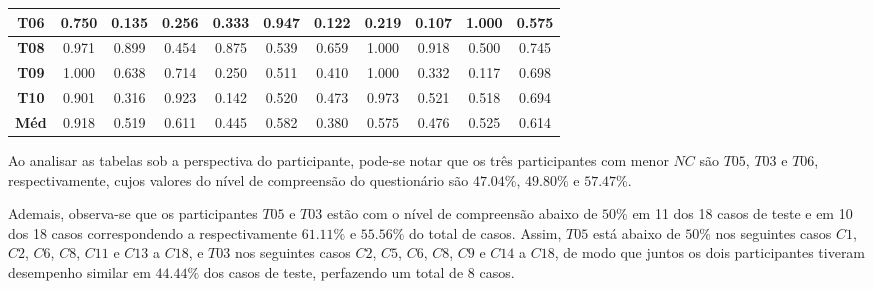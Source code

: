 \begin{table}[htbp]
\begin{tabular}{|c|ccccccccc|c|}
		\textbf{T06} & \multicolumn{1}{c|}{0.750} & \multicolumn{1}{c|}{0.135} & \multicolumn{1}{c|}{0.256} & \multicolumn{1}{c|}{0.333} & \multicolumn{1}{c|}{0.947} & \multicolumn{1}{c|}{0.122} & \multicolumn{1}{c|}{0.219} & \multicolumn{1}{c|}{0.107} & 1.000 & 0.575 \\ \hline
		\rowcolor[HTML]{F2F2F2} 
		\textbf{T08} & \multicolumn{1}{c|}{\cellcolor[HTML]{F2F2F2}0.971} & \multicolumn{1}{c|}{\cellcolor[HTML]{F2F2F2}0.899} & \multicolumn{1}{c|}{\cellcolor[HTML]{F2F2F2}0.454} & \multicolumn{1}{c|}{\cellcolor[HTML]{F2F2F2}0.875} & \multicolumn{1}{c|}{\cellcolor[HTML]{F2F2F2}0.539} & \multicolumn{1}{c|}{\cellcolor[HTML]{F2F2F2}0.659} & \multicolumn{1}{c|}{\cellcolor[HTML]{F2F2F2}1.000} & \multicolumn{1}{c|}{\cellcolor[HTML]{F2F2F2}0.918} & 0.500 & 0.745 \\ \hline
		\textbf{T09} & \multicolumn{1}{c|}{1.000} & \multicolumn{1}{c|}{0.638} & \multicolumn{1}{c|}{0.714} & \multicolumn{1}{c|}{0.250} & \multicolumn{1}{c|}{0.511} & \multicolumn{1}{c|}{0.410} & \multicolumn{1}{c|}{1.000} & \multicolumn{1}{c|}{0.332} & 0.117 & 0.698 \\ \hline
		\rowcolor[HTML]{F2F2F2} 
		\textbf{T10} & \multicolumn{1}{c|}{\cellcolor[HTML]{F2F2F2}0.901} & \multicolumn{1}{c|}{\cellcolor[HTML]{F2F2F2}0.316} & \multicolumn{1}{c|}{\cellcolor[HTML]{F2F2F2}0.923} & \multicolumn{1}{c|}{\cellcolor[HTML]{F2F2F2}0.142} & \multicolumn{1}{c|}{\cellcolor[HTML]{F2F2F2}0.520} & \multicolumn{1}{c|}{\cellcolor[HTML]{F2F2F2}0.473} & \multicolumn{1}{c|}{\cellcolor[HTML]{F2F2F2}0.973} & \multicolumn{1}{c|}{\cellcolor[HTML]{F2F2F2}0.521} & 0.518 & 0.694 \\ \hline
		\textbf{Méd} & \multicolumn{1}{c|}{0.918} & \multicolumn{1}{c|}{0.519} & \multicolumn{1}{c|}{0.611} & \multicolumn{1}{c|}{0.445} & \multicolumn{1}{c|}{0.582} & \multicolumn{1}{c|}{0.380} & \multicolumn{1}{c|}{0.575} & \multicolumn{1}{c|}{0.476} & 0.525 & 0.614 \\ \hline
	\end{tabular}
	\label{tab:F3_A2_NCQ_EF1_2}
\end{table}

Ao analisar as tabelas sob a perspectiva do participante, pode-se notar que os três participantes com menor $NC$ são $T05$, $T03$ e $T06$, respectivamente, cujos valores do nível de compreensão do questionário são $47.04\%$, $49.80\%$ e $57.47\%$.

Ademais, observa-se que os participantes $T05$ e $T03$ estão com o nível de compreensão abaixo de $50\%$ em 11 dos 18 casos de teste e em 10 dos 18 casos correspondendo a respectivamente $61.11\%$ e $55.56\%$ do total de casos. Assim, $T05$ está abaixo de $50\%$ nos seguintes casos $C1$, $C2$, $C6$, $C8$, $C11$ e $C13$ a $C18$, e $T03$ nos seguintes casos $C2$, $C5$, $C6$, $C8$, $C9$ e $C14$ a $C18$, de modo que juntos os dois participantes tiveram desempenho similar em $44.44\%$ dos casos de teste, perfazendo um total de 8 casos.

